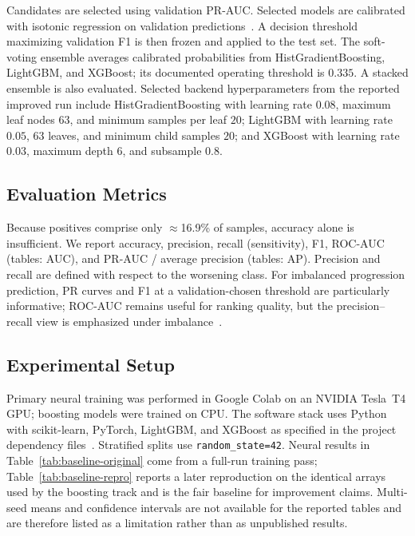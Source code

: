 \documentclass[conference]{IEEEtran}
\begin{document}
Candidates are selected using validation PR-AUC. Selected models are calibrated with isotonic regression on validation predictions~\cite{niculescu2005calibration}. A decision threshold maximizing validation F1 is then frozen and applied to the test set. The soft-voting ensemble averages calibrated probabilities from HistGradientBoosting, LightGBM, and XGBoost; its documented operating threshold is $0.335$. A stacked ensemble is also evaluated. Selected backend hyperparameters from the reported improved run include HistGradientBoosting with learning rate $0.08$, maximum leaf nodes $63$, and minimum samples per leaf $20$; LightGBM with learning rate $0.05$, $63$ leaves, and minimum child samples $20$; and XGBoost with learning rate $0.03$, maximum depth $6$, and subsample $0.8$.

\subsection{Evaluation Metrics}
Because positives comprise only $\approx$16.9\% of samples, accuracy alone is insufficient. We report accuracy, precision, recall (sensitivity), F1, ROC-AUC (tables: AUC), and PR-AUC / average precision (tables: AP). Precision and recall are defined with respect to the worsening class. For imbalanced progression prediction, PR curves and F1 at a validation-chosen threshold are particularly informative; ROC-AUC remains useful for ranking quality, but the precision--recall view is emphasized under imbalance~\cite{saito2015pr,davis2006pr}.

\subsection{Experimental Setup}
Primary neural training was performed in Google Colab on an NVIDIA Tesla~T4 GPU; boosting models were trained on CPU. The software stack uses Python with scikit-learn, PyTorch, LightGBM, and XGBoost as specified in the project dependency files~\cite{pedregosa2011sklearn,paszke2019pytorch,projectrepository}. Stratified splits use \texttt{random\_state=42}. Neural results in Table~\ref{tab:baseline-original} come from a full-run training pass; Table~\ref{tab:baseline-repro} reports a later reproduction on the identical arrays used by the boosting track and is the fair baseline for improvement claims. Multi-seed means and confidence intervals are not available for the reported tables and are therefore listed as a limitation rather than as unpublished results.
\end{document}
